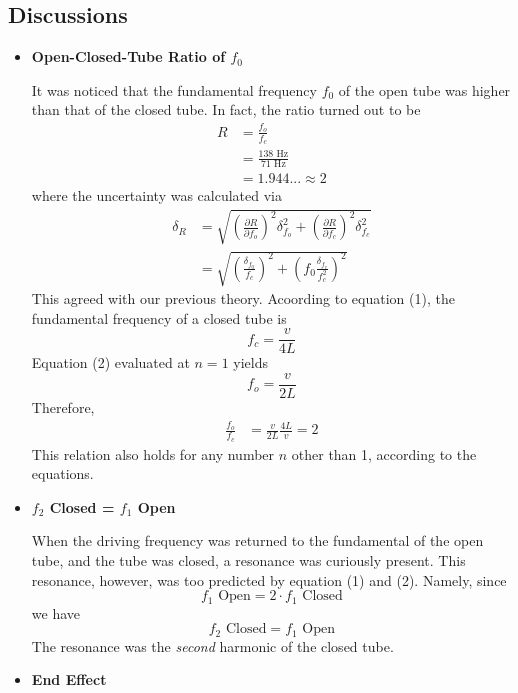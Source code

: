 \subsection{Discussions}
\begin{itemize}
	\item {\textbf{Open-Closed-Tube Ratio of $f_0$}}
	
		It was noticed that the fundamental frequency $f_0$ of the open tube was higher than that of the closed tube. In fact, the ratio turned out to be
		$$\begin{aligned}
		R&=\frac{f_o}{f_c}\\
		&=\frac{138\text{ Hz}}{71\text{ Hz}}\\
		&=1.944...\approx2
		\end{aligned}$$
		where the uncertainty was calculated via
		$$\begin{aligned}
		\delta_R &= \sqrt{
		\left(\frac{\partial R}{\partial f_o}\right)^2\delta^2_{f_o}+
			\left(\frac{\partial R}{\partial f_c}\right)^2\delta^2_{f_c}
	}\\
&= \sqrt{
\left(\frac{\delta_{f_0}}{f_c}\right)^2+
\left(f_0\frac{\delta_{f_c}}{f_c^2}\right)^2
}
\end{aligned}
$$
		This agreed with our previous theory. Acoording to equation (1), the fundamental frequency of a closed tube is
		$$
		f_{c}=\frac v{4L}
		$$
		Equation (2) evaluated at $n = 1$ yields
		$$
		f_{o}=\frac v{2L}
		$$
		Therefore,
		$$\begin{aligned}
		\frac{f_{o}}{f_{c}}&=\frac v{2L}\frac {4L}{v}=2
		\end{aligned}
		$$
This relation also holds for any number $n$ other than 1, according to the equations.
\newline
	\item {\textbf{$f_2$ Closed = $f_1$ Open}}
	
	When the driving frequency was returned to the fundamental of the open tube, and the tube was closed, a resonance was curiously present. This resonance, however, was too predicted by equation (1) and (2). Namely, since $$
	f_1 \text{ Open} = 2\cdot f_1 \text{ Closed}
	$$
	we have
	$$
	f_2 \text{ Closed} = f_1 \text{ Open}
	$$
	The resonance was the \emph{second} harmonic of the closed tube.
\newline
	\item {\textbf{End Effect}}
		

\end{itemize}

